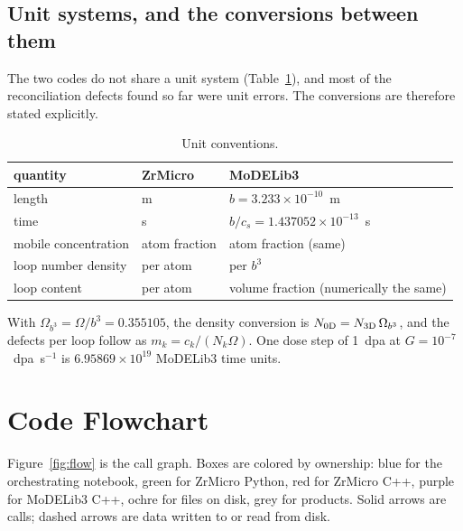 \documentclass[11pt]{article}
\newcommand{\ZrM}{\textsf{ZrMicro}}
\newcommand{\MoD}{\textsf{MoDELib3}}
\begin{document}
\subsection{Unit systems, and the conversions between them}

The two codes do not share a unit system (Table~\ref{tab:units}), and most of the
reconciliation defects found so far were unit errors. The conversions are
therefore stated explicitly.

\begin{table}[htbp]
\centering
\caption{Unit conventions.}
\label{tab:units}
\begin{tabular}{@{}lll@{}}
\toprule
quantity & \ZrM{} & \MoD{} \\
\midrule
length & m & $b = 3.233\times10^{-10}$~m \\
time & s & $b/c_s = 1.437052\times10^{-13}$~s \\
mobile concentration & atom fraction & atom fraction (same) \\
loop number density & per atom & per $b^3$ \\
loop content & per atom & volume fraction (numerically the same) \\
\bottomrule
\end{tabular}
\end{table}

\noindent
With $\Omega_{b^3} = \Omega/b^3 = 0.355105$, the density conversion is
$N_{\rm 0D} = N_{\rm 3D}\,\Omega_{b^3}$, and the defects per loop follow as
$m_k = c_k/(N_k\Omega)$. One dose step of 1~dpa at $G=10^{-7}$~dpa~s$^{-1}$ is
$6.95869\times10^{19}$ \MoD{} time units.

\section{Code Flowchart}
\label{sec:flow}

Figure~\ref{fig:flow} is the call graph. Boxes are colored by ownership: blue for
the orchestrating notebook, green for \ZrM{} Python, red for \ZrM{} C++, purple
for \MoD{} C++, ochre for files on disk, grey for products. Solid arrows are
calls; dashed arrows are data written to or read from disk.
\end{document}
